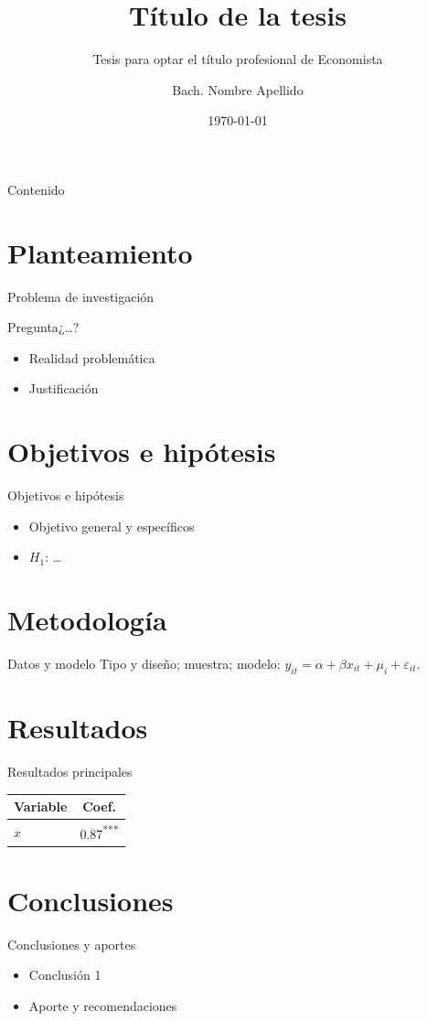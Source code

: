 \documentclass{academic-beamer}
\title{Título de la tesis}
\subtitle{Tesis para optar el título profesional de Economista}
\author{Bach. Nombre Apellido}
\institute{Asesor: Mg. Nombre · UNSCH — E.P. de Economía}
\date{\today}
\begin{document}
\begin{frame}\titlepage\end{frame}
\begin{frame}{Contenido}\tableofcontents\end{frame}

\section{Planteamiento}
\begin{frame}{Problema de investigación}
\begin{block}{Pregunta}¿\ldots?\end{block}
\begin{itemize}\item Realidad problemática \item Justificación\end{itemize}
\end{frame}

\section{Objetivos e hipótesis}
\begin{frame}{Objetivos e hipótesis}
\begin{itemize}\item Objetivo general y específicos \item $H_1$: \ldots\end{itemize}
\end{frame}

\section{Metodología}
\begin{frame}{Datos y modelo}
Tipo y diseño; muestra; modelo: $y_{it}=\alpha+\beta x_{it}+\mu_i+\varepsilon_{it}$.
\end{frame}

\section{Resultados}
\begin{frame}{Resultados principales}
\begin{table}\centering\begin{tabular}{lc}\toprule Variable & Coef. \\\midrule $x$ & 0.87\textsuperscript{***} \\\bottomrule\end{tabular}\end{table}
\end{frame}

\section{Conclusiones}
\begin{frame}{Conclusiones y aportes}
\begin{itemize}\item Conclusión 1 \item Aporte y recomendaciones\end{itemize}
\vfill{}
\end{frame}
\end{document}

